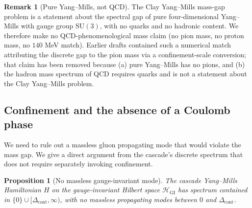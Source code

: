 \documentclass[11pt, a4paper]{amsart}
\newtheorem{proposition}[theorem]{Proposition}
\theoremstyle{definition}
\newtheorem{remark}[theorem]{Remark}
\newcommand{\HH}{\mathcal{H}}
\begin{document}
\begin{remark}[Pure Yang--Mills, not QCD]\label{rem:physicalmass}
The Clay Yang--Mills mass-gap problem is a statement about the
spectral gap of pure four-dimensional Yang--Mills with gauge group
$\mathrm{SU}(3)$, with no quarks and no hadronic content. We
therefore make no QCD-phenomenological mass claim
(no pion mass, no proton mass, no $140$ MeV match). Earlier drafts
contained such a numerical match attributing the discrete gap to
the pion mass via a confinement-scale conversion; that claim has
been removed because (a) pure Yang--Mills has no pions, and (b) the
hadron mass spectrum of QCD requires quarks and is not a statement
about the Clay Yang--Mills problem.
\end{remark}

\subsection{Confinement and the absence of a Coulomb phase}

We need to rule out a massless gluon propagating mode that would
violate the mass gap. We give a direct argument from the cascade's
discrete spectrum that does not require separately invoking
confinement.

\begin{proposition}[No massless gauge-invariant mode]\label{prop:conf}
The cascade Yang--Mills Hamiltonian $H$ on the gauge-invariant
Hilbert space $\HH_{\mathrm{GI}}$ has spectrum contained in
$\{0\} \cup [\Delta_{\mathrm{cont}}, \infty)$, with no massless
propagating modes between $0$ and $\Delta_{\mathrm{cont}}$.
\end{proposition}
\end{document}

